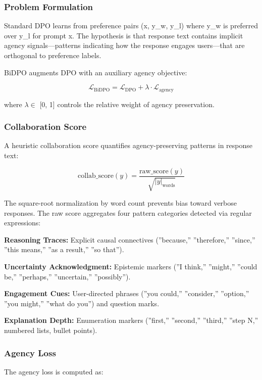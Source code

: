 
\subsubsection{Problem Formulation}

Standard DPO learns from preference pairs (x, y\_w, y\_l) where y\_w is preferred over y\_l for prompt x. The hypothesis is that response text contains implicit agency signals---patterns indicating how the response engages users---that are orthogonal to preference labels.

BiDPO augments DPO with an auxiliary agency objective:

$$\mathcal{L}_{\text{BiDPO}} = \mathcal{L}_{\text{DPO}} + \lambda \cdot \mathcal{L}_{\text{agency}}$$

where $\lambda \in$ [0, 1] controls the relative weight of agency preservation.

\subsubsection{Collaboration Score}

A heuristic collaboration score quantifies agency-preserving patterns in response text:

$$\text{collab\_score}(y) = \frac{\text{raw\_score}(y)}{\sqrt{|y|_{\text{words}}}}$$

The square-root normalization by word count prevents bias toward verbose responses. The raw score aggregates four pattern categories detected via regular expressions:

\textbf{Reasoning Traces:} Explicit causal connectives (''because,'' ''therefore,'' ''since,'' ''this means,'' ''as a result,'' ''so that'').

\textbf{Uncertainty Acknowledgment:} Epistemic markers (''I think,'' ''might,'' ''could be,'' ''perhaps,'' ''uncertain,'' ''possibly'').

\textbf{Engagement Cues:} User-directed phrases (''you could,'' ''consider,'' ''option,'' ''you might,'' ''what do you'') and question marks.

\textbf{Explanation Depth:} Enumeration markers (''first,'' ''second,'' ''third,'' ''step N,'' numbered lists, bullet points).

\subsubsection{Agency Loss}

The agency loss is computed as:

